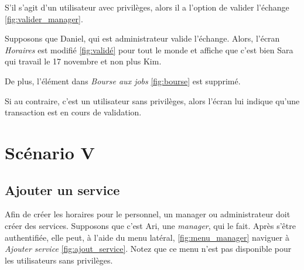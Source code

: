 S'il s'agit d'un utilisateur avec privilèges, alors il a l'option de valider l'échange \ref{fig:valider_manager}. 

Supposons que Daniel, qui est administrateur valide l'échange. Alors, l'écran \textit{Horaires} est modifié \ref{fig:validé}
pour tout le monde et affiche que c'est bien Sara qui travail le 17 novembre et non plus Kim. 

De plus, l'élément dans \textit{Bourse aux jobs} \ref{fig:bourse} est supprimé.

Si au contraire, c'est un utilisateur sans privilèges, alors l'écran lui indique qu'une transaction est en cours de validation.
\newpage
\section[Ajouter un service - Scénario V]{Scénario V}
    \subsection*{Ajouter un service}
    Afin de créer les horaires pour le personnel, un manager ou administrateur doit créer des services. Supposons
    que c'est Ari, une \textit{manager}, qui le fait. Après s'être authentifiée, elle peut, à l'aide du menu latéral, \ref{fig:menu_manager} naviguer
    à \textit{Ajouter service} \ref{fig:ajout_service}. Notez que ce menu n'est pas disponible pour les utilisateurs sans privilèges.

